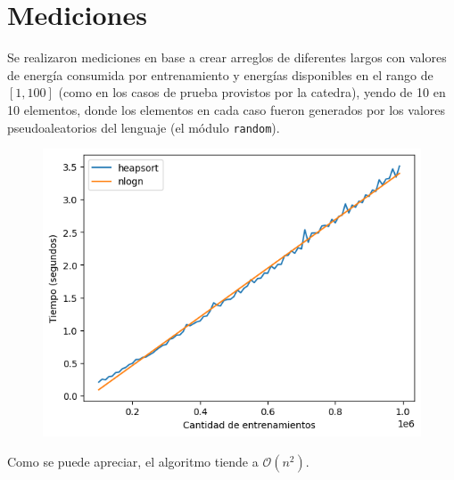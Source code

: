 \section{Mediciones}

Se realizaron mediciones en base a crear arreglos de diferentes largos con
valores de energ\'ia consumida por entrenamiento y energ\'ias disponibles en el
rango de $[1,100]$ (como en los casos de prueba provistos por la catedra),
yendo de 10 en 10 elementos, donde los elementos en cada caso fueron generados
por los valores pseudoaleatorios del lenguaje (el m\'odulo \texttt{random}).

\begin{figure}[H]
    \centering %
    \includegraphics[width=1\textwidth]{img/tiempos.png}
\end{figure}

Como se puede apreciar, el algoritmo tiende a $\mathcal{O}\left( n^2 \right)$.
